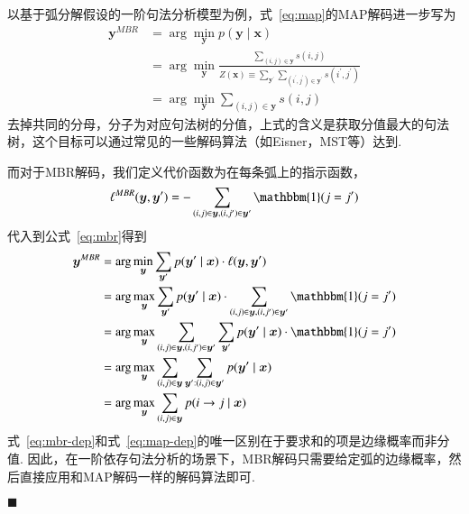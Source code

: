 以基于弧分解假设的一阶句法分析模型为例，式~\ref{eq:map}的MAP解码进一步写为
\begin{equation}
    \label{eq:map-dep}
    \begin{split}
        \boldsymbol{y}^{MBR}&=\arg\min_{\boldsymbol{y}}p(\boldsymbol{y}\mid\boldsymbol{x})\\
        &=\arg\min_{\boldsymbol{y}}\frac{\sum_{(i,j)\in \boldsymbol{y}}s(i,j)}{Z(\boldsymbol{x})\equiv \sum_{\boldsymbol{y}^{\prime}}\sum_{(i^{\prime},j^{\prime})\in \boldsymbol{y}^{\prime}}s(i^{\prime},j^{\prime})}\\
        &=\arg\min_{\boldsymbol{y}}\sum_{(i,j)\in \boldsymbol{y}}s(i,j)
    \end{split}
\end{equation}
去掉共同的分母，分子为对应句法树的分值，上式的含义是获取分值最大的句法树，这个目标可以通过常见的一些解码算法（如Eisner，MST等）达到.

而对于MBR解码，我们定义代价函数为在每条弧上的指示函数，
\begin{equation}
    \ell^{MBR}(\boldsymbol{y},\boldsymbol{y}^{\prime}) = -\sum_{(i,j)\in\boldsymbol{y},(i,j^{\prime})\in\boldsymbol{y}^{\prime}}\mathbbm{1}(j=j^{\prime})
\end{equation}
代入到公式~\ref{eq:mbr}得到
\begin{equation}
    \label{eq:mbr-dep}
    \begin{split}
        \boldsymbol{y}^{MBR}&= \arg\min_{\boldsymbol{y}}\sum_{\boldsymbol{y}^{\prime}}p(\boldsymbol{y}^{\prime}\mid\boldsymbol{x})\cdot\ell(\boldsymbol{y},\boldsymbol{y}^{\prime})\\
        &=\arg\max_{\boldsymbol{y}}\sum_{\boldsymbol{y}^{\prime}}p(\boldsymbol{y}^{\prime}\mid\boldsymbol{x})\cdot\sum_{(i,j)\in\boldsymbol{y},(i,j^{\prime})\in\boldsymbol{y}^{\prime}}\mathbbm{1}(j=j^{\prime})\\
        &=\arg\max_{\boldsymbol{y}}\sum_{(i,j)\in\boldsymbol{y},(i,j^{\prime})\in\boldsymbol{y}^{\prime}}\sum_{\boldsymbol{y}^{\prime}}p(\boldsymbol{y}^{\prime}\mid\boldsymbol{x})\cdot\mathbbm{1}(j=j^{\prime})\\
        &=\arg\max_{\boldsymbol{y}}\sum_{(i,j)\in\boldsymbol{y}}\sum_{\boldsymbol{y}^{\prime}:(i,j)\in \boldsymbol{y}^{\prime}}p(\boldsymbol{y}^{\prime}\mid\boldsymbol{x})\\
        &=\arg\max_{\boldsymbol{y}}\sum_{(i,j)\in\boldsymbol{y}}p(i\rightarrow j\mid\boldsymbol{x})
    \end{split}
\end{equation}
式~\ref{eq:mbr-dep}和式~\ref{eq:map-dep}的唯一区别在于要求和的项是边缘概率而非分值.
因此，在一阶依存句法分析的场景下，MBR解码只需要给定弧的边缘概率，然后直接应用和MAP解码一样的解码算法即可\cite{smith-smith-2007-probabilistic, smith-2011-linguistic}.

\noindent$\blacksquare$

